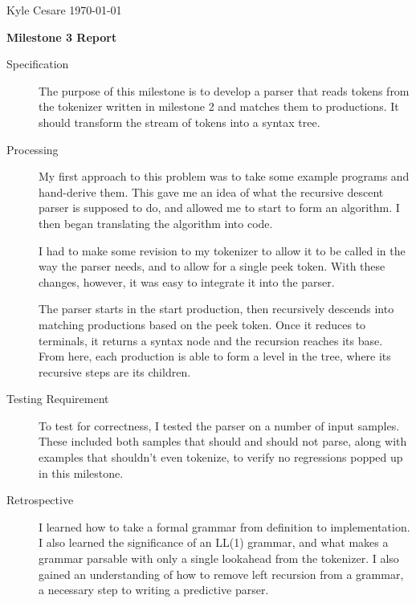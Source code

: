 \documentclass[12pt,letterpaper]{article}
\begin{document}
Kyle Cesare \hfill
\today \hfill

{\center\textbf{Milestone 3 Report} \\}

\begin{description}

\item[Specification] The purpose of this milestone is to develop a parser that
  reads tokens from the tokenizer written in milestone 2 and matches them to
  productions. It should transform the stream of tokens into a syntax tree.

\item[Processing] My first approach to this problem was to take some example
  programs and hand-derive them. This gave me an idea of what the recursive
  descent parser is supposed to do, and allowed me to start to form an
  algorithm. I then began translating the algorithm into code.

  I had to make some revision to my tokenizer to allow it to be called in the
  way the parser needs, and to allow for a single peek token. With these
  changes, however, it was easy to integrate it into the parser.

  The parser starts in the start production, then recursively descends into
  matching productions based on the peek token. Once it reduces to terminals, it
  returns a syntax node and the recursion reaches its base. From here, each
  production is able to form a level in the tree, where its recursive steps are
  its children.
  
\item[Testing Requirement] To test for correctness, I tested the parser on a
  number of input samples. These included both samples that should and should
  not parse, along with examples that shouldn't even tokenize, to verify no
  regressions popped up in this milestone.
  
\item[Retrospective] I learned how to take a formal grammar from definition to
  implementation. I also learned the significance of an LL(1) grammar, and what
  makes a grammar parsable with only a single lookahead from the tokenizer. I
  also gained an understanding of how to remove left recursion from a grammar, a
  necessary step to writing a predictive parser.
  
\end{description}
\end{document}
